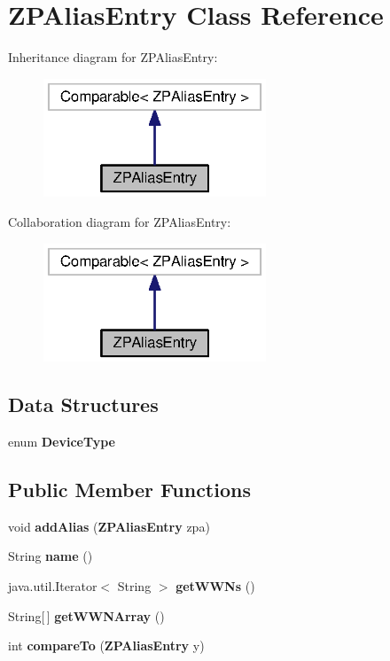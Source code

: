 \section{Z\+P\+Alias\+Entry Class Reference}
\label{classorg_1_1smallfoot_1_1parser_1_1zone_1_1ZPAliasEntry}


Inheritance diagram for Z\+P\+Alias\+Entry\+:\nopagebreak
\begin{figure}[H]
\begin{center}
\leavevmode
\includegraphics[width=188pt]{classorg_1_1smallfoot_1_1parser_1_1zone_1_1ZPAliasEntry__inherit__graph}
\end{center}
\end{figure}


Collaboration diagram for Z\+P\+Alias\+Entry\+:\nopagebreak
\begin{figure}[H]
\begin{center}
\leavevmode
\includegraphics[width=188pt]{classorg_1_1smallfoot_1_1parser_1_1zone_1_1ZPAliasEntry__coll__graph}
\end{center}
\end{figure}
\subsection*{Data Structures}
\begin{DoxyCompactItemize}
\item 
enum {\bf Device\+Type}
\end{DoxyCompactItemize}
\subsection*{Public Member Functions}
\begin{DoxyCompactItemize}
\item 
void {\bf add\+Alias} ({\bf Z\+P\+Alias\+Entry} zpa)
\item 
String {\bf name} ()
\item 
java.\+util.\+Iterator$<$ String $>$ {\bf get\+W\+W\+Ns} ()
\item 
String[$\,$] {\bf get\+W\+W\+N\+Array} ()
\item 
int {\bf compare\+To} ({\bf Z\+P\+Alias\+Entry} y)
\end{DoxyCompactItemize}


